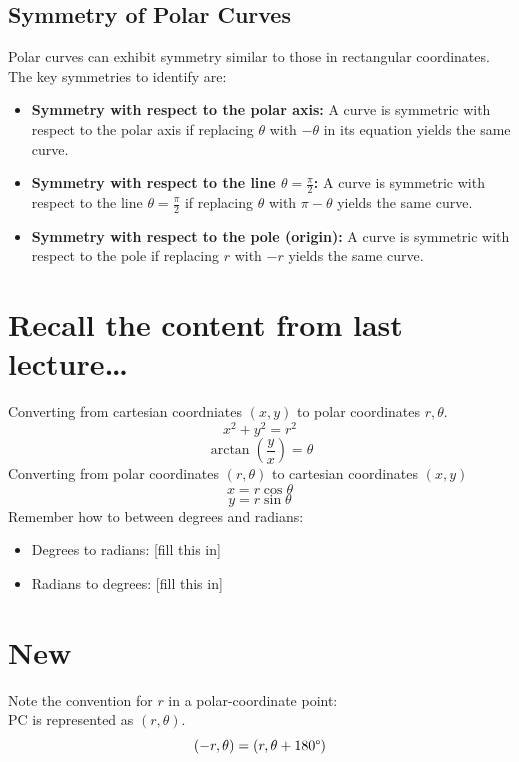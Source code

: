 \documentclass{article}
\begin{document}
\subsection*{Symmetry of Polar Curves}
\begin{theorembox}
    Polar curves can exhibit symmetry similar to those in rectangular coordinates. The key symmetries to identify are:
    \begin{itemize}
        \item \textbf{Symmetry with respect to the polar axis:} A curve is symmetric with respect to the polar axis if replacing \( \theta \) with \( -\theta \) in its equation yields the same curve.
        \item \textbf{Symmetry with respect to the line \( \theta = \frac{\pi}{2} \):} A curve is symmetric with respect to the line \( \theta = \frac{\pi}{2} \) if replacing \( \theta \) with \( \pi - \theta \) yields the same curve.
        \item \textbf{Symmetry with respect to the pole (origin):} A curve is symmetric with respect to the pole if replacing \( r \) with \( -r \) yields the same curve.
    \end{itemize}
\end{theorembox}


\setcounter{page}{2}
\normalsize

\section*{Recall the content from last lecture\dots}
\begin{notebox}
Converting from cartesian coordniates \( (x, y) \) to polar coordinates \( r, \theta \).
\[
    x^2 + y^2 = r^2
\]
\[
    \arctan(\dfrac{y}{x}) = \theta
\]
Converting from polar coordinates \( (r, \theta) \) to cartesian coordinates \( (x, y) \) 
\[
    x = r\cos\theta
\]
\[
    y = r\sin\theta
\]
Remember how to between degrees and radians:
\begin{itemize}
    \item Degrees to radians: [fill this in]
    \item Radians to degrees: [fill this in]
\end{itemize}
\end{notebox}

\section*{New}
\begin{conceptbox}
Note the convention for \( r \) in a polar-coordinate point: \\
PC is represented as \( (r, \theta) \).
\[
    (-r, \theta) = (r, \theta + 180\text{\textdegree})
\]
\end{conceptbox}
\end{document}
